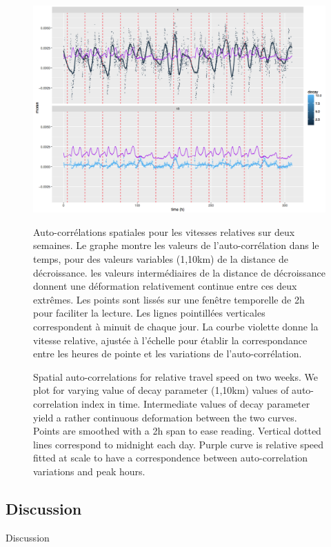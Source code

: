 \begin{figure}
\includegraphics[width=\textwidth,height=0.6\textheight]{Figures/TransportationEquilibrium/gr5}
\caption{Spatial auto-correlations for relative travel speed on two weeks. We plot for varying value of decay parameter (1,10km) values of auto-correlation index in time. Intermediate values of decay parameter yield a rather continuous deformation between the two curves. Points are smoothed with a 2h span to ease reading. Vertical dotted lines correspond to midnight each day. Purple curve is relative speed fitted at scale to have a correspondence between auto-correlation variations and peak hours.}{Auto-corrélations spatiales pour les vitesses relatives sur deux semaines. Le graphe montre les valeurs de l'auto-corrélation dans le temps, pour des valeurs variables (1,10km) de la distance de décroissance. les valeurs intermédiaires de la distance de décroissance donnent une déformation relativement continue entre ces deux extrêmes. Les points sont lissés sur une fenêtre temporelle de 2h pour faciliter la lecture. Les lignes pointillées verticales correspondent à minuit de chaque jour. La courbe violette donne la vitesse relative, ajustée à l'échelle pour établir la correspondance entre les heures de pointe et les variations de l'auto-corrélation.}
\label{fig:fig-5}
\end{figure}




\subsection{Discussion}{Discussion}

